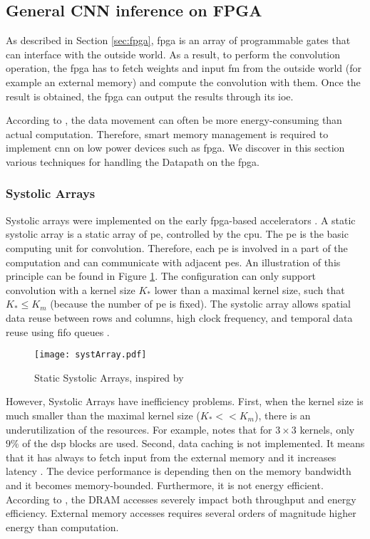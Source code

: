 \subsection{General CNN inference on FPGA} \label{sec:dt_general}
%
As described in Section \ref{sec:fpga}, \acrshort{fpga} is an array of programmable gates that can interface with the outside world. As a result, to perform the convolution operation, the \acrshort{fpga} has to fetch weights and input \acrshort{fm} from the outside world (for example an external memory) and compute the convolution with them. Once the result is obtained, the \acrshort{fpga} can output the results through its \acrshort{ioe}.

According to \textcite{chen_eyeriss_2017}, the data movement can often be more energy-consuming than actual computation. Therefore, smart memory management is required to implement \acrshort{cnn} on low power devices such as \acrshort{fpga}. We discover in this section various techniques for handling the Datapath on the \acrshort{fpga}.

\subsubsection{Systolic Arrays}
%
%
Systolic arrays were implemented on the early \acrshort{fpga}-based accelerators \cite{abdelouahab_accelerating_2018, farabet_cnp_2009, gokhale_240_2014}. A static systolic array is a static array of \acrfull{pe}, controlled by the \acrshort{cpu}. The \acrshort{pe} is the basic computing unit for convolution. Therefore, each \acrshort{pe} is involved in a part of the computation and can communicate with adjacent \acrshort{pe}s. An illustration of this principle can be found in Figure \ref{fig:sytar}. The configuration can only support convolution with a kernel size $K_*$ lower than a maximal kernel size, such that $K_* \leq K_m$ (because the number of \acrshort{pe} is fixed). The systolic array allows spatial data reuse between rows and columns, high clock frequency, and temporal data reuse using \acrshort{fifo} queues \cite{joos_de_ter_beerst_accelerating_2019, mittal_survey_2020}.
%
\begin{figure}[H]
    \centering
    \texttt{[image: systArray.pdf]}
    \caption{Static Systolic Arrays, inspired by \cite{abdelouahab_accelerating_2018}}
    \label{fig:sytar}
\end{figure}

However, Systolic Arrays have inefficiency problems. First, when the kernel size is much smaller than the maximal kernel size ($K_* << K_m$), there is an underutilization of the resources. For example, \cite{gokhale_240_2014} notes that for $3 \times 3$ kernels, only $9\%$ of the \acrfull{dsp} blocks are used. Second, data caching is not implemented. It means that it has always to fetch input from the external memory and it increases latency \cite{abdelouahab_accelerating_2018, wei_automated_2017}. The device performance is depending then on the memory bandwidth and it becomes memory-bounded. Furthermore, it is not energy efficient. According to \textcite{horowitz_11_2014}, the DRAM accesses severely impact both throughput and energy efficiency. External memory accesses requires several orders of magnitude higher energy than computation.
%
%
